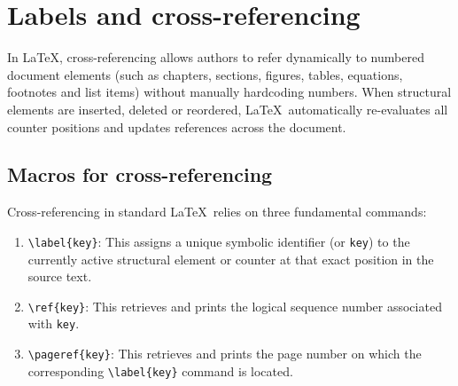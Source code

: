 \section{Labels and cross-referencing}
	In \LaTeX, cross-referencing allows authors to refer dynamically to numbered document elements (such as chapters, sections, figures, tables, equations, footnotes and list items) without manually hardcoding numbers. When structural elements are inserted, deleted or reordered, \LaTeX\ automatically re-evaluates all counter positions and updates references across the document.
	
	\subsection{Macros for cross-referencing}
		Cross-referencing in standard \LaTeX\ relies on three fundamental commands:
		\begin{enumerate}
			\item \lstinline|\label{key}|: This assigns a unique symbolic identifier (or \verb|key|) to the currently active structural element or counter at that exact position in the source text.
			\item \lstinline|\ref{key}|: This retrieves and prints the logical sequence number associated with \verb|key|.
			\item \lstinline|\pageref{key}|: This retrieves and prints the page number on which the corresponding \lstinline|\label{key}| command is located.
		\end{enumerate}
		
